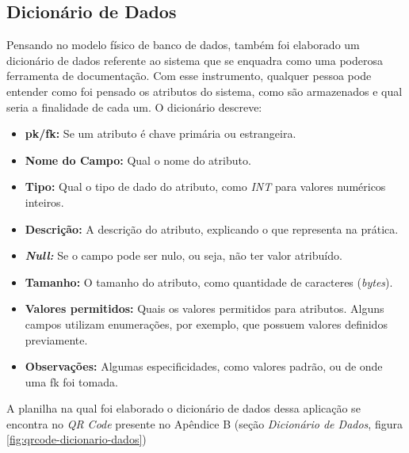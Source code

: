 \subsection{Dicionário de Dados}
Pensando no modelo físico de banco de dados, também foi elaborado um dicionário de dados referente ao sistema que se enquadra como uma poderosa ferramenta de documentação. Com esse instrumento, qualquer pessoa pode entender como foi pensado os atributos do sistema, como são armazenados e qual seria a finalidade de cada um.
O dicionário descreve:
\begin{itemize}
	\item \textbf{\gls{pk}/\gls{fk}:} Se um atributo é chave primária ou estrangeira.
	\item \textbf{Nome do Campo:} Qual o nome do atributo.
	\item \textbf{Tipo:} Qual o tipo de dado do atributo, como \textit{INT} para valores numéricos inteiros.
	\item \textbf{Descrição:} A descrição do atributo, explicando o que representa na prática.
	\item \textbf{\textit{Null:}} Se o campo pode ser nulo, ou seja, não ter valor atribuído.
	\item \textbf{Tamanho:} O tamanho do atributo, como quantidade de caracteres (\textit{bytes}).
	\item \textbf{Valores permitidos:} Quais os valores permitidos para atributos. Alguns campos utilizam enumerações, por exemplo, que possuem valores definidos previamente.
	\item \textbf{Observações:} Algumas especificidades, como valores padrão, ou de onde uma \gls{fk} foi tomada.
\end{itemize}

A planilha na qual foi elaborado o dicionário de dados dessa aplicação se encontra no \textit{QR Code} presente no Apêndice B (seção \emph{Dicionário de Dados}, figura \ref{fig:qrcode-dicionario-dados})






